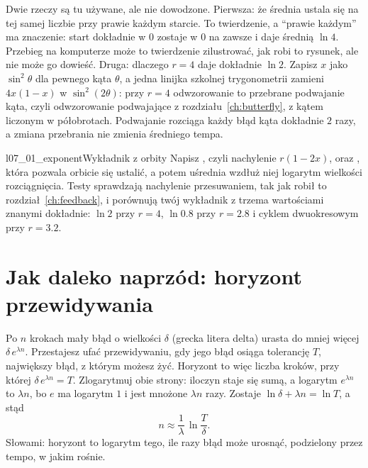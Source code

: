 
\begin{rigourbox}
Dwie rzeczy są tu używane, ale nie dowodzone. Pierwsza: że średnia ustala się
na tej samej liczbie przy prawie każdym starcie. To twierdzenie, a
\enquote{prawie każdym} ma znaczenie: start dokładnie w $0$ zostaje w $0$ na
zawsze i daje średnią $\ln 4$. Przebieg na komputerze może to twierdzenie
zilustrować, jak robi to rysunek, ale nie może go dowieść. Druga: dlaczego
$r = 4$ daje dokładnie $\ln 2$. Zapisz $x$ jako $\sin^{2}\theta$ dla pewnego
kąta $\theta$, a jedna linijka szkolnej trygonometrii zamieni $4x(1 - x)$ w
$\sin^{2}(2\theta)$: przy $r = 4$ odwzorowanie to przebrane podwajanie kąta,
czyli odwzorowanie podwajające z rozdziału~\ref{ch:butterfly}, z kątem
liczonym w półobrotach. Podwajanie rozciąga każdy błąd kąta dokładnie $2$
razy, a zmiana przebrania nie zmienia średniego tempa.
\end{rigourbox}

\begin{lab}{l07_01_exponent}{Wykładnik z orbity}
Napisz , czyli nachylenie $r(1 - 2x)$, oraz ,
która pozwala orbicie się ustalić, a potem uśrednia wzdłuż niej logarytm
wielkości rozciągnięcia. Testy sprawdzają nachylenie przesuwaniem, tak jak
robił to rozdział~\ref{ch:feedback}, i porównują twój wykładnik z trzema
wartościami znanymi dokładnie: $\ln 2$ przy $r = 4$, $\ln\num{0.8}$ przy
$r = \num{2.8}$ i cyklem dwuokresowym przy $r = \num{3.2}$.
\end{lab}

\section{Jak daleko naprzód: horyzont przewidywania}
\label{sec:ch07-horizon}

\noindent
Po $n$ krokach mały błąd o wielkości $\delta$ (grecka litera delta) urasta do
mniej więcej $\delta\, e^{\lambda n}$. Przestajesz ufać przewidywaniu, gdy
jego błąd osiąga tolerancję $T$, największy błąd, z którym możesz żyć.
Horyzont to więc liczba kroków, przy której $\delta\, e^{\lambda n} = T$.
Zlogarytmuj obie strony: iloczyn staje się sumą, a logarytm $e^{\lambda n}$
to $\lambda n$, bo $e$ ma logarytm $1$ i jest mnożone $\lambda n$ razy.
Zostaje $\ln\delta + \lambda n = \ln T$, a stąd
\[ n \approx \frac{1}{\lambda}\,\ln\frac{T}{\delta}. \]
Słowami: horyzont to logarytm tego, ile razy błąd może urosnąć, podzielony
przez tempo, w jakim rośnie.

